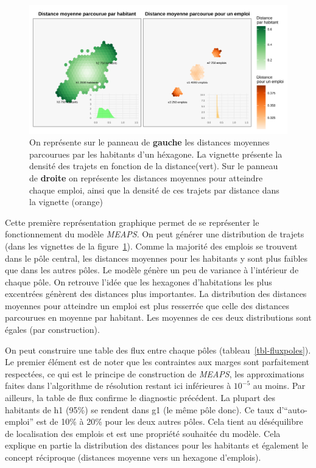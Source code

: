 \documentclass[
  10pt,
  a4paper,
  numbers=noendperiod,
  DIV=9]{scrreprt}
\begin{document}
\begin{figure}[htb]

{\centering \includegraphics[width=1\textwidth,height=\textheight]{./output/gdistances.png}

}

\caption[Distances moyenne par habitant et pour un
emploi]{\label{fig-distances}On représente sur le panneau de
\textbf{gauche} les distances moyennes parcourues par les habitants d'un
héxagone. La vignette présente la densité des trajets en fonction de la
distance(vert). Sur le panneau de \textbf{droite} on représente les
distances moyennes pour atteindre chaque emploi, ainsi que la densité de
ces trajets par distance dans la vignette (orange)}

\end{figure}

Cette première représentation graphique permet de se représenter le
fonctionnement du modèle \emph{MEAPS}. On peut générer une distribution
de trajets (dans les vignettes de la figure~\ref{fig-distances}). Comme
la majorité des emplois se trouvent dans le pôle central, les distances
moyennes pour les habitants y sont plus faibles que dans les autres
pôles. Le modèle génère un peu de variance à l'intérieur de chaque pôle.
On retrouve l'idée que les hexagones d'habitations les plus excentrées
génèrent des distances plus importantes. La distribution des distances
moyennes pour atteindre un emploi est plus resserrée que celle des
distances parcourues en moyenne par habitant. Les moyennes de ces deux
distributions sont égales (par construction).

On peut construire une table des flux entre chaque pôles
(tableau~\ref{tbl-fluxpoles}). Le premier élément est de noter que les
contraintes aux marges sont parfaitement respectées, ce qui est le
principe de construction de \emph{MEAPS}, les approximations faites dans
l'algorithme de résolution restant ici inférieures à \(10^{-5}\) au
moins. Par ailleurs, la table de flux confirme le diagnostic précédent.
La plupart des habitants de h1 (95\%) se rendent dans g1 (le même pôle
donc). Ce taux d'``auto-emploi'' est de 10\% à 20\% pour les deux autres
pôles. Cela tient au déséquilibre de localisation des emplois et est une
propriété souhaitée du modèle. Cela explique en partie la distribution
des distances pour les habitants et également le concept réciproque
(distances moyenne vers un hexagone d'emplois).
\end{document}
